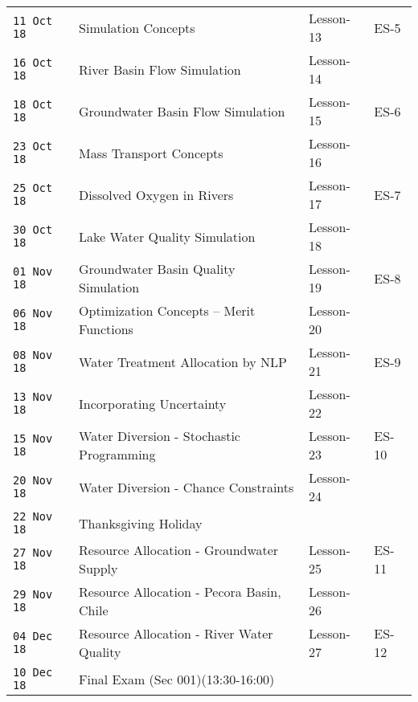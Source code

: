\documentclass[12pt]{article}
\begin{document}
\begin{longtable}{p{0.8in} | p{3.5in} | p{1.0in} | p{0.5in} | }
\texttt{11 Oct 18} & Simulation Concepts & Lesson-13 & ES-5 \\
\texttt{16 Oct 18} & River Basin Flow Simulation & Lesson-14 &  \\
\texttt{18 Oct 18} & Groundwater Basin Flow Simulation & Lesson-15 & ES-6 \\
\texttt{23 Oct 18} & Mass Transport Concepts & Lesson-16 &  \\
\texttt{25 Oct 18} & Dissolved Oxygen in Rivers & Lesson-17 & ES-7 \\
\texttt{30 Oct 18} & Lake Water Quality Simulation & Lesson-18 &  \\
\texttt{01 Nov 18} & Groundwater Basin Quality Simulation & Lesson-19 & ES-8 \\
\texttt{06 Nov 18} & Optimization Concepts -- Merit Functions & Lesson-20 &  \\
\texttt{08 Nov 18} & Water Treatment Allocation by NLP & Lesson-21 & ES-9 \\
\texttt{13 Nov 18} & Incorporating Uncertainty & Lesson-22 &  \\
\texttt{15 Nov 18} & Water Diversion - Stochastic Programming & Lesson-23 & ES-10 \\
\texttt{20 Nov 18} & Water Diversion - Chance Constraints & Lesson-24 &  \\
\hline
\hline
\texttt{22 Nov 18} & Thanksgiving Holiday &  &  \\
\hline
\hline
\texttt{27 Nov 18} & Resource Allocation - Groundwater Supply & Lesson-25 & ES-11 \\
\texttt{29 Nov 18} & Resource Allocation - Pecora Basin, Chile & Lesson-26 &  \\
\texttt{04 Dec 18} & Resource Allocation - River Water Quality & Lesson-27 & ES-12 \\
\hline
\hline
\texttt{10 Dec 18} & Final Exam (Sec 001)(13:30-16:00) &  &  \\
\hline
\hline
\end{longtable}
\normalsize

%
\end{document}
